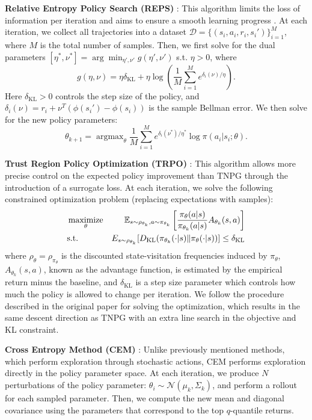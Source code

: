 \documentclass{article}
\newcommand{\cD}{\mathcal{D}}
\newcommand{\cN}{\mathcal{N}}
\newcommand{\bE}{\mathbb{E}}
\newcommand{\thetaold}{{\theta_k}}
\begin{document}
{\bf Relative Entropy Policy Search (REPS)} \cite{Peters10REPS}: This algorithm limits the loss of information per iteration and aims to ensure a smooth learning progress \cite{Deisenroth2013PSSurvey}. At each iteration, we collect all trajectories into a dataset $\cD = \{(s_i, a_i, r_i, s_i') \}_{i=1}^M$, where $M$ is the total number of samples. Then, we first solve for the dual parameters $[\eta^*, \nu^*] = \arg\min_{\eta', \nu'} g(\eta', \nu')$ s.t. $\eta > 0$, where
$$g(\eta, \nu) = \eta\delta_{\text{KL}} + \eta \log \left( \frac{1}{M} \sum_{i=1}^M e^{\delta_i(\nu) / \eta}\right).$$
Here $\delta_{\text{KL}}> 0$ controls the step size of the policy, and $\delta_i(\nu) = r_i + \nu^T(\phi(s_i') - \phi(s_i))$ is the sample Bellman error. We then solve for the new policy parameters: $$\theta_{k+1} = \mathop{\arg\max}_{\theta} \frac{1}{M} \sum_{i=1}^M e^{\delta_i(\nu^*) / \eta^*} \log \pi(a_i | s_i; \theta).$$




{\bf Trust Region Policy Optimization (TRPO)} \cite{Schulman15TRPO}: 
This algorithm allows more precise control on the expected policy improvement than TNPG through the introduction of a surrogate loss.
At each iteration, we solve the following constrained optimization problem (replacing expectations with samples):
\begin{eqnarray*}
&\mathop{\textrm{maximize}}_{\theta}& \bE_{s \sim \rho_\thetaold, a \sim \pi_\thetaold} \left[ \frac{\pi_\theta(a|s)}{\pi_\thetaold(a|s)} A_\thetaold (s, a)\right]\cr
&\text{s.t.}& E_{s\sim \rho_{\thetaold}}[D_{\text{KL}}(\pi_\thetaold(\cdot |s) \| \pi_\theta(\cdot|s))] \leq \delta_{\text{KL}}
\end{eqnarray*}
where $\rho_\theta = \rho_{\pi_\theta}$ is the discounted state-visitation frequencies induced by $\pi_\theta$,
$A_{\theta_k}(s, a)$, known as the advantage function, is estimated by the empirical return minus the baseline, and $\delta_{\text{KL}}$ is a step size parameter which controls how much the policy is allowed to change per iteration. We follow the procedure described in the original paper for solving the optimization, which results in the same descent direction as TNPG with an extra line search in the objective and KL constraint.


{\bf Cross Entropy Method (CEM)} \cite{Rubinstein99CEM, Szita06CEM}: Unlike previously mentioned methods, which perform exploration through stochastic actions, CEM performs exploration directly in the policy parameter space. At each iteration, we produce $N$ perturbations of the policy parameter: $\theta_i \sim \cN(\mu_k, \Sigma_k)$, and perform a rollout for each sampled parameter. Then, we compute the new mean and diagonal covariance using the parameters that correspond to the top $q$-quantile returns.
\end{document}
